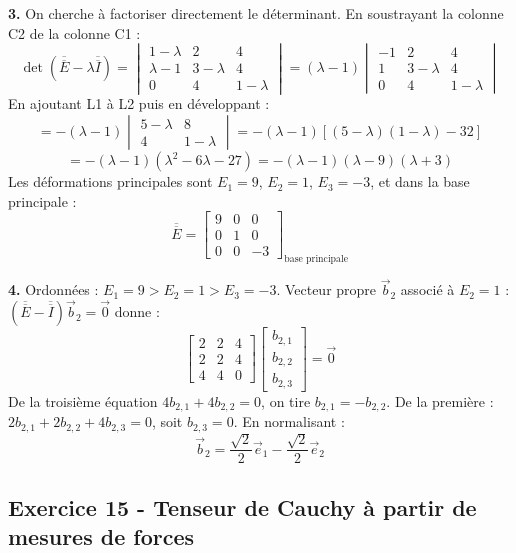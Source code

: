 \documentclass[12pt,a4paper]{article}
\begin{document}
\begin{boitecorrige}
\textbf{3.} On cherche à factoriser directement le déterminant. En soustrayant la colonne C2 de la colonne C1 :
\[
\det(\overline{\overline{E}}-\lambda\overline{\overline{I}}) = \begin{vmatrix}1-\lambda&2&4\\\lambda-1&3-\lambda&4\\0&4&1-\lambda\end{vmatrix} = (\lambda-1)\begin{vmatrix}-1&2&4\\1&3-\lambda&4\\0&4&1-\lambda\end{vmatrix}
\]
En ajoutant L1 à L2 puis en développant :
\[
= -(\lambda-1)\begin{vmatrix}5-\lambda&8\\4&1-\lambda\end{vmatrix} = -(\lambda-1)\left[(5-\lambda)(1-\lambda)-32\right]
\]
\[
= -(\lambda-1)(\lambda^2-6\lambda-27) = -(\lambda-1)(\lambda-9)(\lambda+3)
\]
Les déformations principales sont $E_1=9$, $E_2=1$, $E_3=-3$, et dans la base principale :
\[
\overline{\overline{E}} = \begin{bmatrix}9&0&0\\0&1&0\\0&0&-3\end{bmatrix}_{\text{base principale}}
\]

\textbf{4.} Ordonnées : $E_1=9 > E_2=1 > E_3=-3$. Vecteur propre $\vec{b}_2$ associé à $E_2=1$ : $(\overline{\overline{E}}-\overline{\overline{I}})\vec{b}_2=\vec{0}$ donne :
\[
\begin{bmatrix}2&2&4\\2&2&4\\4&4&0\end{bmatrix}\begin{bmatrix}b_{2,1}\\b_{2,2}\\b_{2,3}\end{bmatrix}=\vec{0}
\]
De la troisième équation $4b_{2,1}+4b_{2,2}=0$, on tire $b_{2,1}=-b_{2,2}$. De la première : $2b_{2,1}+2b_{2,2}+4b_{2,3}=0$, soit $b_{2,3}=0$. En normalisant :
\[
\vec{b}_2 = \frac{\sqrt{2}}{2}\vec{e}_1 - \frac{\sqrt{2}}{2}\vec{e}_2
\]
\end{boitecorrige}


\subsection*{Exercice 15 - Tenseur de Cauchy à partir de mesures de forces \niveau{\difficile}}
\end{document}
